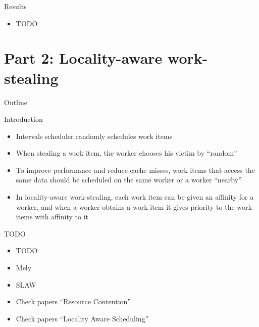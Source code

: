\begin{frame}{Results}
  \begin{itemize}
  \item TODO
  \end{itemize}
\end{frame}


\section{Part 2: Locality-aware work-stealing}

\begin{frame}{Outline}
  \tableofcontents[current]
\end{frame}

\begin{frame}{Introduction}
  \begin{itemize}
  \item Intervals scheduler randomly schedules work items
  \item When stealing a work item, the worker chooses his victim by
    ``random''
  \item To improve performance and reduce cache misses, work items
    that access the same data should be scheduled on the same worker
    or a worker ``nearby''
  \item In locality-aware work-stealing, each work item can be given
    an affinity for a worker, and when a worker obtains a work item it
    gives priority to the work items with affinity to it
  \end{itemize}
\end{frame}

\begin{frame}{TODO}
  \begin{itemize}
  \item TODO
  \item Mely
  \item SLAW
  \item Check papers ``Resource Contention''
  \item Check papers ``Locality Aware Scheduling''
  \end{itemize}
\end{frame}




